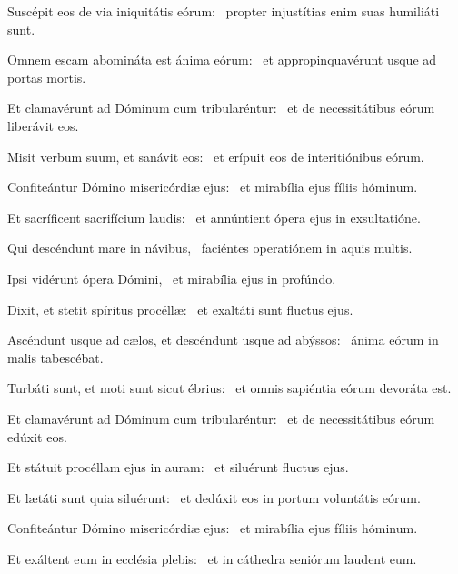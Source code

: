 \item Suscépit eos de via iniquitátis eórum:~\psstar{} propter injustítias enim suas humiliáti sunt.

\item Omnem escam abomináta est ánima eórum:~\psstar{} et appropinquavérunt usque ad portas mortis.

\item Et clamavérunt ad Dóminum cum tribularéntur:~\psstar{} et de necessitátibus eórum liberávit eos.

\item Misit verbum suum, et sanávit eos:~\psstar{} et erípuit eos de interitiónibus eórum.

\item Confiteántur Dómino misericórdiæ ejus:~\psstar{} et mirabília ejus fíliis hóminum.

\item Et sacríficent sacrifícium laudis:~\psstar{} et annúntient ópera ejus in exsultatióne.

\item Qui descéndunt mare in návibus,~\psstar{} faciéntes operatiónem in aquis multis.

\item Ipsi vidérunt ópera Dómini,~\psstar{} et mirabília ejus in profúndo.

\item Dixit, et stetit spíritus procéllæ:~\psstar{} et exaltáti sunt fluctus ejus.

\item Ascéndunt usque ad cælos, et descéndunt usque ad abýssos:~\psstar{} ánima eórum in malis tabescébat.

\item Turbáti sunt, et moti sunt sicut ébrius:~\psstar{} et omnis sapiéntia eórum devoráta est.

\item Et clamavérunt ad Dóminum cum tribularéntur:~\psstar{} et de necessitátibus eórum edúxit eos.

\item Et státuit procéllam ejus in auram:~\psstar{} et siluérunt fluctus ejus.

\item Et lætáti sunt quia siluérunt:~\psstar{} et dedúxit eos in portum voluntátis eórum.

\item Confiteántur Dómino misericórdiæ ejus:~\psstar{} et mirabília ejus fíliis hóminum.

\item Et exáltent eum in ecclésia plebis:~\psstar{} et in cáthedra seniórum laudent eum.

